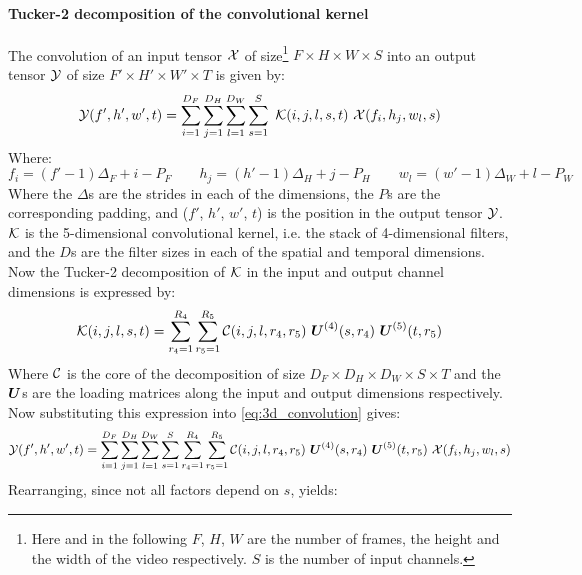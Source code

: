 \paragraph{Tucker-2 decomposition of the convolutional kernel}
The convolution of an input tensor $\mathcal{X}$ of size\footnote{Here and in the following $F$, $H$, $W$ are the number of frames, the height and the width of the video respectively. $S$ is the number of input channels.} $F\times H \times W \times S$ into an output tensor $\mathcal{Y}$ of size $F'\times H' \times W' \times T$ is given by:
\begin{equation}
    \tensor{Y}(f', h', w', t) = \sum_{i=1}^{D_F} \sum_{j=1}^{D_H} \sum_{l=1}^{D_W} \sum_{s=1}^{S} \ \tensor{K}(i, j, l, s, t) \ \tensor{X}(f_i, h_j, w_l, s)
    \label{eq:3d_convolution}
\end{equation}
Where:
\begin{equation}
    f_i = \left(f' - 1\right) \Delta_F + i - P_F \qquad h_j =  \left(h' - 1\right) \Delta_H + j - P_H \qquad w_l =  \left(w' - 1\right) \Delta_W + l - P_W
\end{equation}
Where the $\Delta$s are the strides in each of the dimensions, the $P$s are the corresponding padding, and ($f'$, $h'$, $w'$, $t$) is the position in the output tensor $\mathcal{Y}$. $\mathcal{K}$ is the 5-dimensional convolutional kernel, i.e. the stack of 4-dimensional filters, and the $D$s are the filter sizes in each of the spatial and temporal dimensions. Now the Tucker-2 decomposition of $\mathcal{K}$ in the input and output channel dimensions is expressed by:
\begin{equation}
\mathcal{K}(i, j, l, s, t)=\sum_{r_{4}=1}^{R_{4}} \sum_{r_{5}=1}^{R_{5}} \mathcal{C}(i, j, l, r_{4}, r_{5}) \ \boldsymbol{U}^{(4)}(s, r_{4}) \  \boldsymbol{U}^{(5)}(t, r_{5})
\end{equation}
Where $\mathcal{C}$ is the core of the decomposition of size $D_F\times D_H \times D_W \times S \times T$ and the $\boldsymbol{U}$s are the loading matrices along the input and output dimensions respectively. Now substituting this expression into \eqref{eq:3d_convolution} gives:
\begin{equation}
    \tensor{Y}(f', h', w', t) = \sum_{i=1}^{D_F} \sum_{j=1}^{D_H} \sum_{l=1}^{D_W} \sum_{s=1}^{S} \sum_{r_{4}=1}^{R_{4}} \sum_{r_{5}=1}^{R_{5}} \tensor{C}(i, j, l, r_{4}, r_{5}) \ \boldsymbol{U}^{(4)}(s, r_{4}) \  \boldsymbol{U}^{(5)}(t, r_{5}) \ \tensor{X}(f_i, h_j, w_l, s)
\end{equation}
Rearranging, since not all factors depend on $s$, yields:

